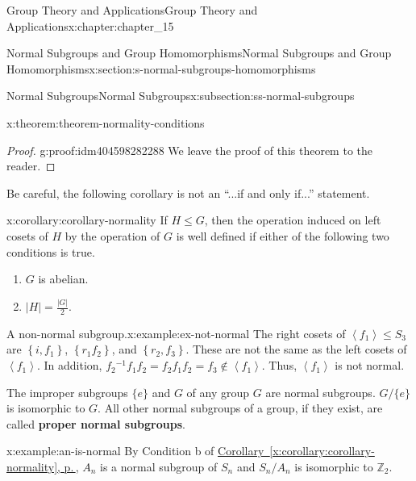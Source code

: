 \documentclass[twoside,10pt,]{book}
\newcommand{\xreffont}{\relax}
\newcommand{\terminology}[1]{\textbf{#1}}
\numberwithin{equation}{section}
\begin{document}
\begin{chapterptx}{Group Theory and Applications}{}{Group Theory and Applications}{}{}{x:chapter:chapter_15}
\begin{sectionptx}{Normal Subgroups and Group Homomorphisms}{}{Normal Subgroups and Group Homomorphisms}{}{}{x:section:s-normal-subgroups-homomorphisms}
\begin{subsectionptx}{Normal Subgroups}{}{Normal Subgroups}{}{}{x:subsection:ss-normal-subgroups}
\begin{theorem}{}{}{x:theorem:theorem-normality-conditions}
\begin{enumerate}[label=(\alph*)]
\end{enumerate}
%
\end{theorem}
\begin{proof}{}{g:proof:idm404598282288}
We leave the proof of this theorem to the reader.%
\end{proof}
Be careful, the following corollary is not an ``...if and only if...'' statement.%
\begin{corollary}{}{}{x:corollary:corollary-normality}%
If \(H \leq G\), then the operation induced on left cosets of \(H\) by the operation of \(G\) is well defined if either of the following two conditions is true.%
\begin{enumerate}[label=(\alph*)]
\item{}\(G\) is abelian.%
\item{}\(\left| H\right|  = \frac{\left| G\right| }{2}\).%
\end{enumerate}
%
\end{corollary}
\begin{example}{A non-normal subgroup.}{x:example:ex-not-normal}%
The right cosets of \(\left\langle f_1\right\rangle \leq  S_3\) are \(\left\{i, f_1\right\}\), \(\left\{r_1 f_2 \right\}\), and \(\left\{r_2 ,f_3\right\}\). These are not the same as the left cosets of \(\left\langle f_1\right\rangle\). In addition, \(f_2{}^{-1}f_1f_2=f_2f_1f_2=f_3\notin
\left\langle f_1\right\rangle\). Thus, \(\left\langle f_1\right\rangle\) is not normal.%
\end{example}
The improper subgroups \(\{e\}\) and \(G\) of any group \(G\) are normal subgroups.  \(G/\{e\}\) is isomorphic to \(G\).  All other normal subgroups of a group, if they exist, are called \terminology{proper normal subgroups}.%
\begin{example}{}{x:example:an-is-normal}%
By Condition b of \hyperref[x:corollary:corollary-normality]{Corollary~{\xreffont\ref{x:corollary:corollary-normality}}, p.\,\pageref{x:corollary:corollary-normality}}, \(A_n\) is a normal subgroup of \(S_n\) and \(S_n/A_n\)  is isomorphic to \(\mathbb{Z}_2\).%
\end{example}
\end{subsectionptx}
\end{sectionptx}
\end{chapterptx}
\end{document}
